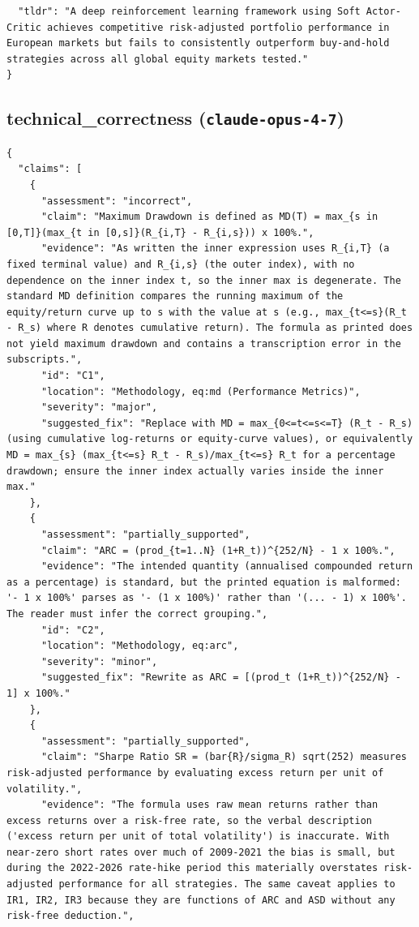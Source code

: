 \documentclass[11pt]{article}
\begin{document}
\begin{verbatim}
  "tldr": "A deep reinforcement learning framework using Soft Actor-Critic achieves competitive risk-adjusted portfolio performance in European markets but fails to consistently outperform buy-and-hold strategies across all global equity markets tested."
}
\end{verbatim}

\subsection*{technical_correctness (\texttt{claude-opus-4-7})}
\begin{verbatim}
{
  "claims": [
    {
      "assessment": "incorrect",
      "claim": "Maximum Drawdown is defined as MD(T) = max_{s in [0,T]}(max_{t in [0,s]}(R_{i,T} - R_{i,s})) x 100%.",
      "evidence": "As written the inner expression uses R_{i,T} (a fixed terminal value) and R_{i,s} (the outer index), with no dependence on the inner index t, so the inner max is degenerate. The standard MD definition compares the running maximum of the equity/return curve up to s with the value at s (e.g., max_{t<=s}(R_t - R_s) where R denotes cumulative return). The formula as printed does not yield maximum drawdown and contains a transcription error in the subscripts.",
      "id": "C1",
      "location": "Methodology, eq:md (Performance Metrics)",
      "severity": "major",
      "suggested_fix": "Replace with MD = max_{0<=t<=s<=T} (R_t - R_s) (using cumulative log-returns or equity-curve values), or equivalently MD = max_{s} (max_{t<=s} R_t - R_s)/max_{t<=s} R_t for a percentage drawdown; ensure the inner index actually varies inside the inner max."
    },
    {
      "assessment": "partially_supported",
      "claim": "ARC = (prod_{t=1..N} (1+R_t))^{252/N} - 1 x 100%.",
      "evidence": "The intended quantity (annualised compounded return as a percentage) is standard, but the printed equation is malformed: '- 1 x 100%' parses as '- (1 x 100%)' rather than '(... - 1) x 100%'. The reader must infer the correct grouping.",
      "id": "C2",
      "location": "Methodology, eq:arc",
      "severity": "minor",
      "suggested_fix": "Rewrite as ARC = [(prod_t (1+R_t))^{252/N} - 1] x 100%."
    },
    {
      "assessment": "partially_supported",
      "claim": "Sharpe Ratio SR = (bar{R}/sigma_R) sqrt(252) measures risk-adjusted performance by evaluating excess return per unit of volatility.",
      "evidence": "The formula uses raw mean returns rather than excess returns over a risk-free rate, so the verbal description ('excess return per unit of total volatility') is inaccurate. With near-zero short rates over much of 2009-2021 the bias is small, but during the 2022-2026 rate-hike period this materially overstates risk-adjusted performance for all strategies. The same caveat applies to IR1, IR2, IR3 because they are functions of ARC and ASD without any risk-free deduction.",

\end{verbatim}
\end{document}
